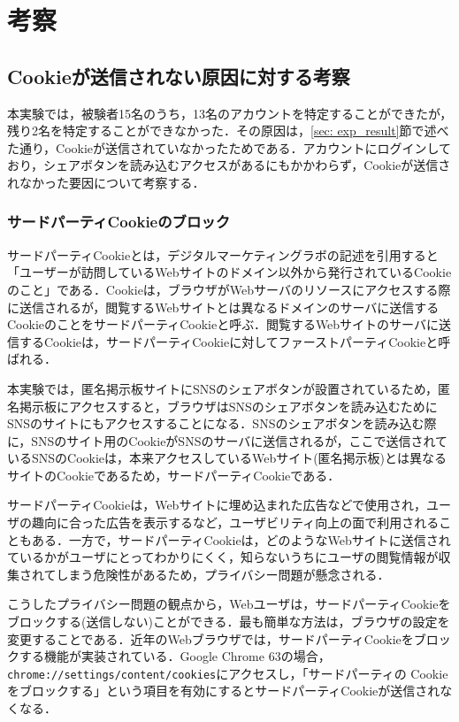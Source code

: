 \documentclass[10pt, a4paper]{jreport}
\begin{document}
\section{考察}
\subsection{Cookieが送信されない原因に対する考察}
本実験では，被験者15名のうち，13名のアカウントを特定することができたが，残り2名を特定することができなかった．その原因は，\ref{sec: exp_result}節で述べた通り，Cookieが送信されていなかったためである．アカウントにログインしており，シェアボタンを読み込むアクセスがあるにもかかわらず，Cookieが送信されなかった要因について考察する．

\subsubsection{サードパーティCookieのブロック}
サードパーティCookieとは，デジタルマーケティングラボの記述を引用すると「ユーザーが訪問しているWebサイトのドメイン以外から発行されているCookieのこと」である\cite{what_is_third_party_cookie}．Cookieは，ブラウザがWebサーバのリソースにアクセスする際に送信されるが，閲覧するWebサイトとは異なるドメインのサーバに送信するCookieのことをサードパーティCookieと呼ぶ．閲覧するWebサイトのサーバに送信するCookieは，サードパーティCookieに対してファーストパーティCookieと呼ばれる．

本実験では，匿名掲示板サイトにSNSのシェアボタンが設置されているため，匿名掲示板にアクセスすると，ブラウザはSNSのシェアボタンを読み込むためにSNSのサイトにもアクセスすることになる．SNSのシェアボタンを読み込む際に，SNSのサイト用のCookieがSNSのサーバに送信されるが，ここで送信されているSNSのCookieは，本来アクセスしているWebサイト(匿名掲示板)とは異なるサイトのCookieであるため，サードパーティCookieである．

サードパーティCookieは，Webサイトに埋め込まれた広告などで使用され，ユーザの趣向に合った広告を表示するなど，ユーザビリティ向上の面で利用されることもある．一方で，サードパーティCookieは，どのようなWebサイトに送信されているかがユーザにとってわかりにくく，知らないうちにユーザの閲覧情報が収集されてしまう危険性があるため，プライバシー問題が懸念される\cite{third_party_cookie_is_danger}．

こうしたプライバシー問題の観点から，Webユーザは，サードパーティCookieをブロックする(送信しない)ことができる．最も簡単な方法は，ブラウザの設定を変更することである．近年のWebブラウザでは，サードパーティCookieをブロックする機能が実装されている．Google Chrome 63の場合，\verb|chrome://settings/content/cookies|にアクセスし，「サードパーティの Cookie をブロックする」という項目を有効にするとサードパーティCookieが送信されなくなる．
\end{document}

